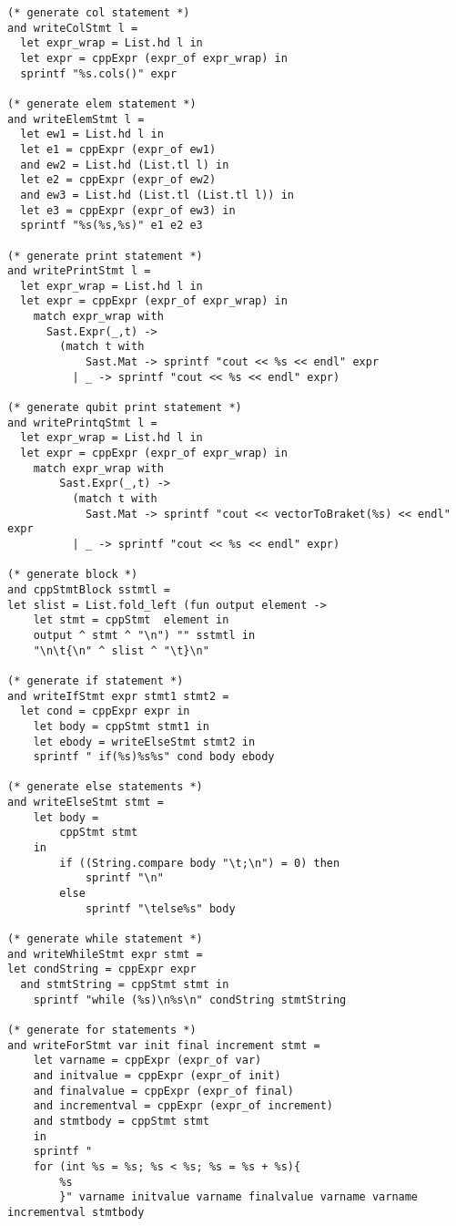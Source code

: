 \begin{lstlisting}
(* generate col statement *)
and writeColStmt l =
  let expr_wrap = List.hd l in
  let expr = cppExpr (expr_of expr_wrap) in 
  sprintf "%s.cols()" expr

(* generate elem statement *)
and writeElemStmt l =
  let ew1 = List.hd l in
  let e1 = cppExpr (expr_of ew1)
  and ew2 = List.hd (List.tl l) in
  let e2 = cppExpr (expr_of ew2)
  and ew3 = List.hd (List.tl (List.tl l)) in
  let e3 = cppExpr (expr_of ew3) in
  sprintf "%s(%s,%s)" e1 e2 e3
 
(* generate print statement *)
and writePrintStmt l =
  let expr_wrap = List.hd l in
  let expr = cppExpr (expr_of expr_wrap) in 
    match expr_wrap with
      Sast.Expr(_,t) -> 
        (match t with 
            Sast.Mat -> sprintf "cout << %s << endl" expr
          | _ -> sprintf "cout << %s << endl" expr)

(* generate qubit print statement *)
and writePrintqStmt l =
  let expr_wrap = List.hd l in
  let expr = cppExpr (expr_of expr_wrap) in 
    match expr_wrap with
        Sast.Expr(_,t) -> 
          (match t with 
            Sast.Mat -> sprintf "cout << vectorToBraket(%s) << endl" expr
          | _ -> sprintf "cout << %s << endl" expr)

(* generate block *)  
and cppStmtBlock sstmtl = 
let slist = List.fold_left (fun output element ->
    let stmt = cppStmt  element in
    output ^ stmt ^ "\n") "" sstmtl in
    "\n\t{\n" ^ slist ^ "\t}\n"

(* generate if statement *)
and writeIfStmt expr stmt1 stmt2 = 
  let cond = cppExpr expr in
    let body = cppStmt stmt1 in
    let ebody = writeElseStmt stmt2 in
    sprintf " if(%s)%s%s" cond body ebody  

(* generate else statements *)
and writeElseStmt stmt =
    let body =
        cppStmt stmt
    in
        if ((String.compare body "\t;\n") = 0) then
            sprintf "\n"
        else
            sprintf "\telse%s" body

(* generate while statement *)
and writeWhileStmt expr stmt = 
let condString = cppExpr expr  
  and stmtString = cppStmt stmt in 
    sprintf "while (%s)\n%s\n" condString stmtString

(* generate for statements *)
and writeForStmt var init final increment stmt =
    let varname = cppExpr (expr_of var) 
    and initvalue = cppExpr (expr_of init)
    and finalvalue = cppExpr (expr_of final)
    and incrementval = cppExpr (expr_of increment)
    and stmtbody = cppStmt stmt
    in
    sprintf "
    for (int %s = %s; %s < %s; %s = %s + %s){
        %s
        }" varname initvalue varname finalvalue varname varname incrementval stmtbody


\end{lstlisting}
